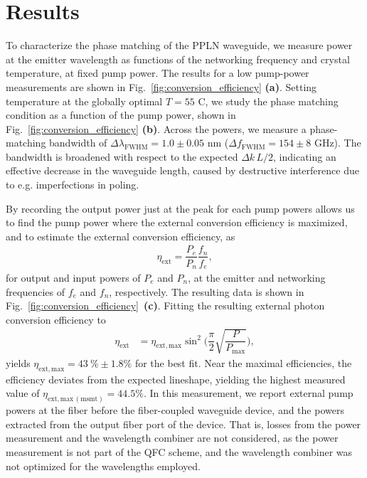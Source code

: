 \documentclass[floatfix,reprint,superscriptaddress,amsmath,amssymb,aps]{revtex4-2}
\begin{document}
\section{Results}
To characterize the phase matching of the PPLN waveguide, we measure power at the emitter wavelength as functions of the networking frequency and crystal temperature, at fixed pump power. The results for a low pump-power measurements are shown in Fig.~\ref{fig:conversion_efficiency} \textbf{(a)}. Setting temperature at the globally optimal $T = 55$ C, we study the phase matching condition as a function of the pump power, shown in Fig.~\ref{fig:conversion_efficiency} \textbf{(b)}. Across the powers, we measure a phase-matching bandwidth of $\Delta \lambda_{\mathrm{FWHM}} = 1.0 \pm 0.05$ nm ($\Delta f_{\mathrm{FWHM}} = 154 \pm 8$ GHz). The bandwidth is broadened with respect to the expected $\Delta k \, L /2$, indicating an effective decrease in the waveguide length, caused by destructive interference due to e.g. imperfections in poling. 

\par
By recording the output power just at the peak for each pump powers allows us to find the pump power where the external conversion efficiency is maximized, and to estimate the external conversion efficiency, as 
\begin{align}
\eta_{\mathrm{ext}} = \dfrac{ P_{e} }{ P_{n} } \dfrac{ f_{n} }{ f_{e} },
\end{align}
for output and input powers of $P_{e}$ and $P_{n}$, at the emitter and networking frequencies of $f_{e}$ and $f_{n}$, respectively. The resulting data is shown in Fig.~\ref{fig:conversion_efficiency}~\textbf{(c)}. Fitting the resulting external photon conversion efficiency to 
\begin{align}
\eta_{\mathrm{ext}}
&=
\eta_{\mathrm{ext},\mathrm{max}} \sin^{2} \bigg( \dfrac{\pi}{2} \sqrt{\dfrac{ P }{ P_{\mathrm{max}} }} \bigg),
\end{align}
yields $\eta_{\mathrm{ext},\mathrm{max}} = 43\ \% \pm 1.8 \%$ for the best fit. Near the maximal efficiencies, the efficiency deviates from the expected lineshape, yielding the highest measured value of $\eta_{\mathrm{ext},\mathrm{max\,(msmt)}} = 44.5 \%$. In this measurement, we report external pump powers at the fiber before the fiber-coupled waveguide device, and the powers extracted from the output fiber port of the device. That is, losses from the power measurement and the wavelength combiner are not considered, as the power measurement is not part of the QFC scheme, and the wavelength combiner was not optimized for the wavelengths employed. 
\end{document}
